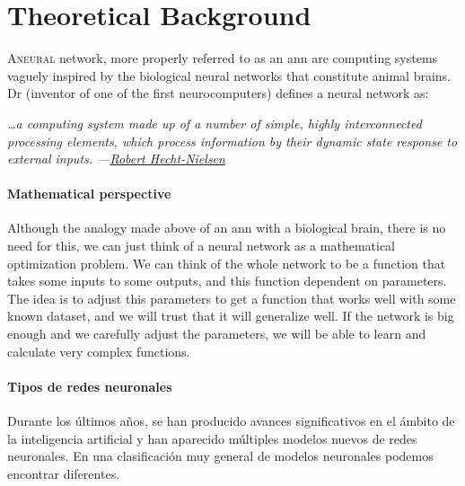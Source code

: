 

\chapter{Theoretical Background} \label{cha:theory}



\lettrine{A}{neural} network, more properly referred to as an \gls{ann} are
computing systems vaguely inspired by the biological neural networks that
constitute animal brains. Dr
 (inventor of one of the first neurocomputers) defines a neural
network as:

\begin{quoteBox}
  \itshape
  \ldots a computing system made up of a number of simple, highly interconnected
  processing elements, which process information by their dynamic state response
  to external inputs.
  \tcblower
  \hfill \upshape
  ---\href{https://en.wikipedia.org/wiki/Robert_Hecht-Nielsen}
  {Robert Hecht-Nielsen}
\end{quoteBox}

\subsubsection{Mathematical perspective}
Although the analogy made above of an \gls{ann} with a biological brain, there
is no need for this, we can just think of a neural network as a mathematical
optimization problem. We can think of the whole network to be a function that
takes some inputs to some outputs, and this function dependent on
parameters. The idea is to adjust this parameters to get a function that works
well with some known dataset, and we will trust that it will generalize
well. If the network is big enough and we carefully adjust the parameters, we
will be able to learn and calculate very complex functions.

\subsubsection{Tipos de redes neuronales}
Durante los últimos años, se han producido avances significativos en el ámbito
de la inteligencia artificial y han aparecido múltiples modelos nuevos de redes
neuronales. En una clasificación muy general de modelos neuronales podemos
encontrar diferentes.

